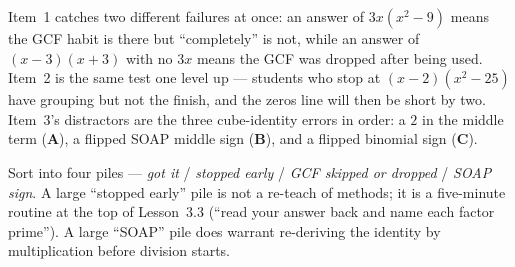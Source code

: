 \documentclass[10pt]{article}
\begin{document}
\begin{teachernote}
Item~1 catches two different failures at once: an answer of $3x(x^2-9)$ means the GCF habit is there
but ``completely'' is not, while an answer of $(x-3)(x+3)$ with no $3x$ means the GCF was dropped
after being used. Item~2 is the same test one level up --- students who stop at $(x-2)(x^2-25)$ have
grouping but not the finish, and the zeros line will then be short by two. Item~3's distractors are
the three cube-identity errors in order: a $2$ in the middle term (\textbf{A}), a flipped SOAP middle
sign (\textbf{B}), and a flipped binomial sign (\textbf{C}).

\vspace{3pt}
Sort into four piles --- \emph{got it} / \emph{stopped early} / \emph{GCF skipped or dropped} /
\emph{SOAP sign}. A large ``stopped early'' pile is not a re-teach of methods; it is a five-minute
routine at the top of Lesson~3.3 (``read your answer back and name each factor prime''). A large
``SOAP'' pile does warrant re-deriving the identity by multiplication before division starts.
\end{teachernote}
\end{document}
